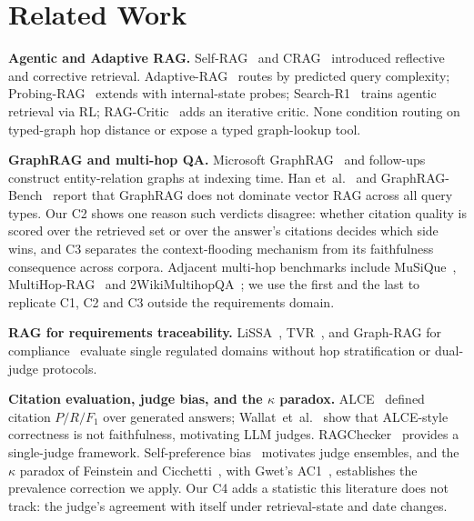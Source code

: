 \section{Related Work}
\label{sec:related}

\noindent\textbf{Agentic and Adaptive RAG.}
Self-RAG~\cite{selfrag2024} and CRAG~\cite{crag2024} introduced reflective
and corrective retrieval. Adaptive-RAG~\cite{adaptiverag2024} routes by
predicted query complexity; Probing-RAG~\cite{probingrag2025} extends with
internal-state probes; Search-R1~\cite{searchr1_2025} trains agentic
retrieval via RL; RAG-Critic~\cite{ragcritic2025} adds an iterative critic.
None condition routing on typed-graph hop distance or expose a typed
graph-lookup tool.

\noindent\textbf{GraphRAG and multi-hop QA.}
Microsoft GraphRAG~\cite{graphrag2024} and follow-ups~\cite{lightrag2024,
hipporag2_2025,graphr1_2025} construct entity-relation graphs at indexing
time. Han et~al.~\cite{ragvsgraphrag2025} and GraphRAG-Bench~\cite{graphragbench2026}
report that GraphRAG does not dominate vector RAG across all query
types. Our C2 shows one reason such verdicts disagree: whether
citation quality is scored over the retrieved set or over the answer's
citations decides which side wins, and C3 separates the
context-flooding mechanism from its faithfulness consequence across
corpora. Adjacent multi-hop benchmarks include
MuSiQue~\cite{musique2022}, MultiHop-RAG~\cite{multihoprag2024} and
2WikiMultihopQA~\cite{twowiki2020}; we use the first and the last to
replicate C1, C2 and C3 outside the requirements domain.

\noindent\textbf{RAG for requirements traceability.}
LiSSA~\cite{lissa2025}, TVR~\cite{niu_tvr2025}, and Graph-RAG for
compliance~\cite{graphragcompliance2024} evaluate single regulated domains
without hop stratification or dual-judge protocols.

\noindent\textbf{Citation evaluation, judge bias, and the $\kappa$ paradox.}
ALCE~\cite{alce2023} defined citation $P/R/F_1$ over generated
answers; Wallat~et~al.~\cite{wallat2024} show that ALCE-style
correctness is not faithfulness, motivating LLM judges. RAGChecker~\cite{ragchecker2024}
provides a single-judge framework. Self-preference
bias~\cite{selfpref_bias2024} motivates judge ensembles, and the
$\kappa$ paradox of Feinstein and Cicchetti~\cite{feinstein1990},
with Gwet's AC1~\cite{gwet2008}, establishes the prevalence
correction we apply. Our C4 adds a
statistic this literature does not track: the judge's agreement with
itself under retrieval-state and date changes.

